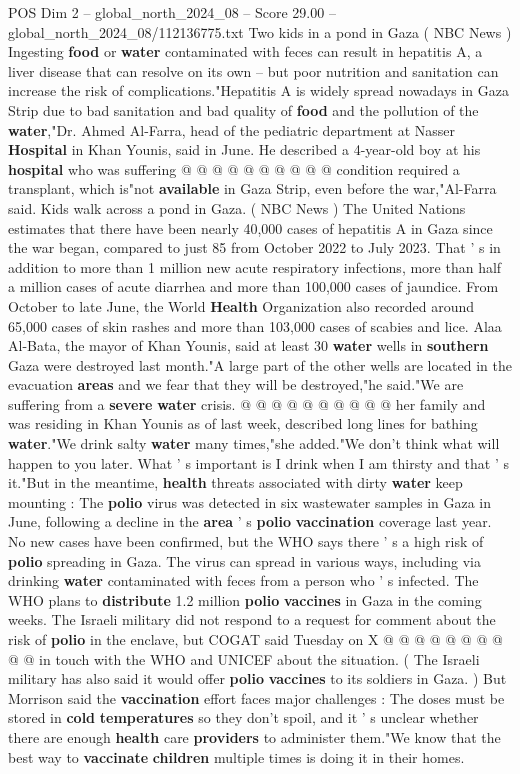 \begin{textsample}{POS Dim 2 – global\_north\_2024\_08 – Score 29.00 – global\_north\_2024\_08/112136775.txt}
Two kids in a pond in Gaza ( NBC News ) Ingesting \textbf{food} or \textbf{water} contaminated with feces can result in hepatitis A, a liver disease that can resolve on its own -- but poor nutrition and sanitation can increase the risk of complications."Hepatitis A is widely spread nowadays in Gaza Strip due to bad sanitation and bad quality of \textbf{food} and the pollution of the \textbf{water},"Dr.
Ahmed Al-Farra, head of the pediatric department at Nasser \textbf{Hospital} in Khan Younis, said in June.
He described a 4-year-old boy at his \textbf{hospital} who was suffering @ @ @ @ @ @ @ @ @ @ condition required a transplant, which is"not \textbf{available} in Gaza Strip, even before the war,"Al-Farra said.
Kids walk across a pond in Gaza. ( NBC News ) The United Nations estimates that there have been nearly 40,000 cases of hepatitis A in Gaza since the war began, compared to just 85 from October 2022 to July 2023.
That ' s in addition to more than 1 million new acute respiratory infections, more than half a million cases of acute diarrhea and more than 100,000 cases of jaundice.
From October to late June, the World \textbf{Health} Organization also recorded around 65,000 cases of skin rashes and more than 103,000 cases of scabies and lice.
Alaa Al-Bata, the mayor of Khan Younis, said at least 30 \textbf{water} wells in \textbf{southern} Gaza were destroyed last month."A large part of the other wells are located in the evacuation \textbf{areas} and we fear that they will be destroyed,"he said."We are suffering from a \textbf{severe} \textbf{water} crisis. @ @ @ @ @ @ @ @ @ @ her family and was residing in Khan Younis as of last week, described long lines for bathing \textbf{water}."We drink salty \textbf{water} many times,"she added."We don't think what will happen to you later.
What ' s important is I drink when I am thirsty and that ' s it."But in the meantime, \textbf{health} threats associated with dirty \textbf{water} keep mounting : The \textbf{polio} virus was detected in six wastewater samples in Gaza in June, following a decline in the \textbf{area} ' s \textbf{polio} \textbf{vaccination} coverage last year.
No new cases have been confirmed, but the WHO says there ' s a high risk of \textbf{polio} spreading in Gaza.
The virus can spread in various ways, including via drinking \textbf{water} contaminated with feces from a person who ' s infected.
The WHO plans to \textbf{distribute} 1.2 million \textbf{polio} \textbf{vaccines} in Gaza in the coming weeks.
The Israeli military did not respond to a request for comment about the risk of \textbf{polio} in the enclave, but COGAT said Tuesday on X @ @ @ @ @ @ @ @ @ @ in touch with the WHO and UNICEF about the situation. ( The Israeli military has also said it would offer \textbf{polio} \textbf{vaccines} to its soldiers in Gaza. ) But Morrison said the \textbf{vaccination} effort faces major challenges : The doses must be stored in \textbf{cold} \textbf{temperatures} so they don't spoil, and it ' s unclear whether there are enough \textbf{health} care \textbf{providers} to administer them."We know that the best way to \textbf{vaccinate} \textbf{children} multiple times is doing it in their homes.

\end{textsample}
